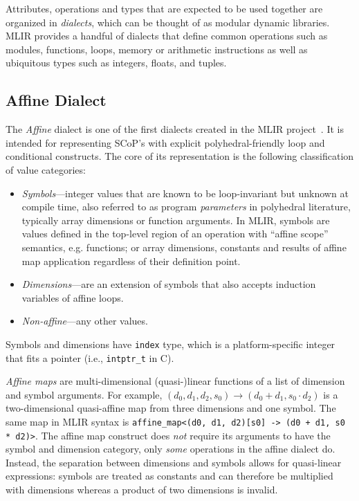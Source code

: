 \documentclass[sigplan]{acmart}
\newcommand{\icode}[1]{{\texttt {#1}}}
\newcommand{\scop}{SCoP\xspace}
\begin{document}
Attributes, operations and types that are expected to be used together are organized in \emph{dialects}, which can be thought of as modular dynamic libraries.
MLIR provides a handful of dialects that define common operations such as modules, functions, loops, memory or arithmetic instructions as well as ubiquitous types such as integers, floats, and tuples.

\subsection{Affine Dialect}\label{sec:affine}
The \emph{Affine} dialect is one of the first dialects created in the MLIR project~\cite{mlir_affine}.
It is intended for representing \scop's with explicit polyhedral-friendly loop and conditional constructs.
The core of its representation is the following classification of value categories:
\begin{itemize}
    \item \emph{Symbols}---integer values that are known to be loop-invariant but unknown at compile time, also referred to as program \emph{parameters} in polyhedral literature, typically array dimensions or function arguments. In MLIR, symbols are values defined in the top-level region of an operation with ``affine scope'' semantics, e.g. functions; or array dimensions, constants and results of affine map application regardless of their definition point.
    \item \emph{Dimensions}---are an extension of symbols that also accepts induction variables of affine loops.
    \item \emph{Non-affine}---any other values.
\end{itemize}
Symbols and dimensions have \icode{index} type, which is a platform-specific integer that fits a pointer (i.e., \icode{intptr\_t} in C).

\emph{Affine maps} are multi-dimensional (quasi-)linear functions of a list of dimension and symbol arguments.
For example, $(d_0, d_1, d_2, s_0) \rightarrow (d_0 + d_1, s_0 \cdot d_2)$ is a two-dimensional quasi-affine map from three dimensions and one symbol.
The same map in MLIR syntax is \icode{affine\_map<(d0, d1, d2)[s0] -> (d0 + d1, s0 * d2)>}.
The affine map construct does \emph{not} require its arguments to have the symbol and dimension category, only \emph{some} operations in the affine dialect do.
Instead, the separation between dimensions and symbols allows for quasi-linear expressions: symbols are treated as constants and can therefore be multiplied with dimensions whereas a product of two dimensions is invalid.
\end{document}
